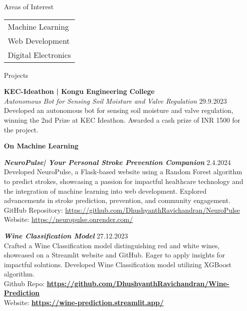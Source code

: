 \documentclass{resume} %
\begin{document}
\begin{rSection}{Areas of Interest}
\begin{tabular}{@{}l}

Machine Learning \\
Web Development\\
Digital Electronics 
\end{tabular}
\end{rSection}

\begin{rSection}{Projects}

\textbf{KEC-Ideathon | Kongu Engineering College} \\
\textit{Autonomous Bot for Sensing Soil Moisture and Valve Regulation} \hfill {29.9.2023}\\
Developed an autonomous bot for sensing soil moisture and valve regulation, winning the 2nd Prize at KEC Ideathon. Awarded a cash prize of INR 1500 for the project.

\textbf{On Machine Learning} 

\textbf{\textit{NeuroPulse| Your Personal Stroke Prevention Companion}} \hfill {2.4.2024}
Developed NeuroPulse, a Flask-based website using a Random Forest algorithm to predict strokes, showcasing a passion for impactful healthcare technology and the integration of machine learning into web development. Explored advancements in stroke prediction, prevention, and community engagement.\\
GitHub Repository: \url{https://github.com/DhushyanthRavichandran/NeuroPulse} \\
Website: \url{https://neuropulse.onrender.com/}

\textbf{\textit{Wine Classification Model}} \hfill {27.12.2023}\\
Crafted a Wine Classification model distinguishing red and white wines, showcased on a Streamlit website and GitHub. Eager to apply insights for impactful solutions. Developed Wine Classification model utilizing XGBoost algorithm. \\
Github Repo: \href{https://github.com/DhushyanthRavichandran/Wine-Prediction}{\textbf{\url{https://github.com/DhushyanthRavichandran/Wine-Prediction}}} \\
Website: \href{https://wine-prediction.streamlit.app/}{\textbf{\url{https://wine-prediction.streamlit.app/}}}

\end{rSection}
\end{document}
